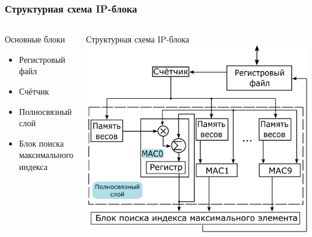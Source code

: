 \begin{frame}[t]
\frametitle{Структурная схема IP-блока}
\begin{columns}
    \begin{block}{\centering Основные блоки}                
        \begin{itemize}\small
            \item Регистровый файл
            \item Счётчик
            \item Полносвязный слой
            \item Блок поиска максимального индекса         
        \end{itemize}
    \end{block}
     
    \begin{block}{\centering Структурная схема IP-блока}
        \vspace{3mm}
        \centering \includegraphics[height = 0.65\textheight]{pics/ip.png}
    \end{block}
\end{columns}


\end{frame}


